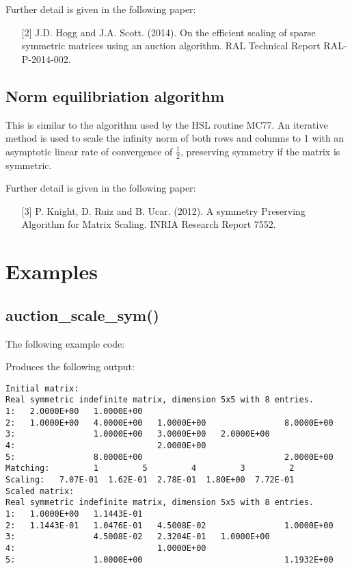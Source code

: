 \noindent
Further detail is given in the following paper:
\begin{itemize}
   \item[{[2]}] J.D. Hogg and J.A. Scott. (2014). On the efficient scaling of sparse symmetric matrices using an auction algorithm. RAL Technical Report RAL-P-2014-002.
\end{itemize}

\subsection{Norm equilibriation algorithm}
This is similar to the algorithm used by the HSL routine MC77.
An iterative method
is used to scale the infinity norm of both rows and columns to 1 with an asymptotic linear rate of convergence of $\frac{1}{2}$, preserving symmetry if the matrix is symmetric.

\noindent
Further detail is given in the following paper:
\begin{itemize}
   \item[{[3]}] P. Knight, D. Ruiz and B. Ucar. (2012). A symmetry Preserving Algorithm for Matrix Scaling. INRIA Research Report 7552.
\end{itemize}



\section{Examples} \label{examples}

\subsection{auction\_scale\_sym()}
The following example code:

Produces the following output:
\begin{verbatim}
Initial matrix:
Real symmetric indefinite matrix, dimension 5x5 with 8 entries.
1:   2.0000E+00   1.0000E+00                                       
2:   1.0000E+00   4.0000E+00   1.0000E+00                8.0000E+00
3:                1.0000E+00   3.0000E+00   2.0000E+00             
4:                             2.0000E+00                          
5:                8.0000E+00                             2.0000E+00
Matching:         1         5         4         3         2
Scaling:   7.07E-01  1.62E-01  2.78E-01  1.80E+00  7.72E-01
Scaled matrix:
Real symmetric indefinite matrix, dimension 5x5 with 8 entries.
1:   1.0000E+00   1.1443E-01                                       
2:   1.1443E-01   1.0476E-01   4.5008E-02                1.0000E+00
3:                4.5008E-02   2.3204E-01   1.0000E+00             
4:                             1.0000E+00                          
5:                1.0000E+00                             1.1932E+00
\end{verbatim}



